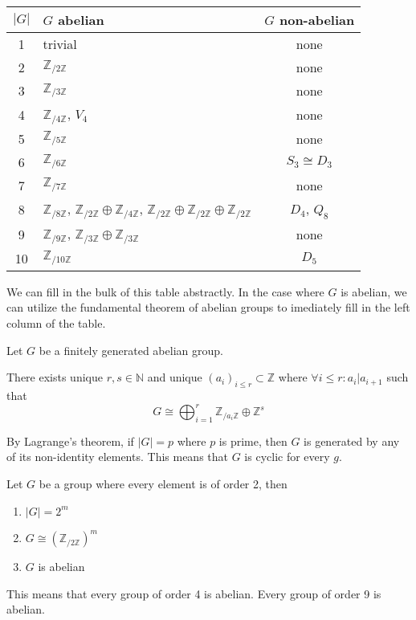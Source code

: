 \begin{center}
   \begin{tabular}{|c|l|c|}
      \(|G|\) & \(G\) abelian & \(G\) non-abelian \\
      \hline
      1 & trivial                                & none\\
      2 & \(\mathbb{Z}_{/2\mathbb{Z}}\)          & none \\
      3 & \(\mathbb{Z}_{/3\mathbb{Z}}\)          & none \\
      4 & \(\mathbb{Z}_{/4\mathbb{Z}}\), \(V_4\) & none \\
      5 & \(\mathbb{Z}_{/5\mathbb{Z}}\)          & none \\
      \hline
      6  & \(\mathbb{Z}_{/6\mathbb{Z}}\)         & \(S_3 \cong D_3\) \\
      7  & \(\mathbb{Z}_{/7\mathbb{Z}}\)         & none \\
      8  & \(\mathbb{Z}_{/8\mathbb{Z}}\), \(\mathbb{Z}_{/2\mathbb{Z}} \oplus \mathbb{Z}_{/4\mathbb{Z}}\), \(\mathbb{Z}_{/2\mathbb{Z}} \oplus \mathbb{Z}_{/2\mathbb{Z}} \oplus \mathbb{Z}_{/2\mathbb{Z}}\)           & \(D_4\), \(Q_8\) \\
      9  & \(\mathbb{Z}_{/9\mathbb{Z}}\), \(\mathbb{Z}_{/3\mathbb{Z}} \oplus \mathbb{Z}_{/3\mathbb{Z}}\) & none \\
      10 & \(\mathbb{Z}_{/10\mathbb{Z}}\)        & \(D_5\) \\
   \end{tabular}
\end{center}

We can fill in the bulk of this table abstractly.
In the case where \(G\) is abelian, we can utilize the fundamental theorem of abelian groups to imediately fill in the left column of the table.

\begin{theorem}
   Let \(G\) be a finitely generated abelian group.

   There exists unique \(r, s \in \mathbb{N}\) and unique \((a_i)_{i \leq r} \subset \mathbb{Z}\) where \(\forall i \leq r: a_i | a_{i+1}\) such that
   \[G \cong \bigoplus_{i = 1}^r \mathbb{Z}_{/a_i\mathbb{Z}} \oplus \mathbb{Z}^s\]
\end{theorem}

By Lagrange's theorem, if \(|G| = p\) where \(p\) is prime, then \(G\) is generated by any of its non-identity elements.
This means that \(G\) is cyclic for every \(g\).

\begin{proposition}
   Let \(G\) be a group where every element is of order 2, then
   \begin{enumerate}[label=\roman*, align=Center]
      \item \(|G| = 2^m\)
      \item \(G \cong (\mathbb{Z}_{/2\mathbb{Z}})^m\)
      \item \(G\) is abelian
   \end{enumerate}
\end{proposition}
\begin{remark}
   This means that every group of order 4 is abelian.
   Every group of order 9 is abelian.
\end{remark}

